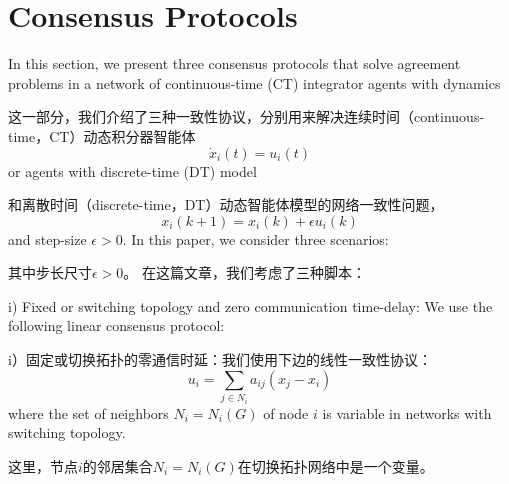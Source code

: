 \documentclass{article}
\begin{document}
\section{Consensus Protocols}
{\color[gray]{0.5}
\noindent In this section, we present three consensus protocols that solve agreement problems in a network of continuous-time (CT) {\color{green}integrator agents} with dynamics
}

\noindent 这一部分，我们介绍了三种一致性协议，分别用来解决连续时间（continuous-time，CT）动态积分器智能体
\begin{equation}
    \dot{x}_i(t) = u_i(t)
    \tag{4}
    \label{4}
\end{equation}
{\color[gray]{0.5}
\noindent or agents with discrete-time (DT) model
}

\noindent 和离散时间（discrete-time，DT）动态智能体模型的网络一致性问题，
\begin{equation}
    x_i(k+1) = x_i(k)+\epsilon u_i(k)
    \tag{5}
    \label{5}
\end{equation}
{\color[gray]{0.5}
\noindent and step-size $\epsilon>0$. 
In this paper, we consider three scenarios:
}

\noindent 其中步长尺寸$\epsilon>0$。
在这篇文章，我们考虑了三种脚本：

{\color[gray]{0.5}
i) Fixed or switching topology and zero communication time-delay: We use the following linear consensus protocol:
}

i）固定或切换拓扑的零通信时延：我们使用下边的线性一致性协议：
\begin{equation}
    u_i = \sum_{j\in N_i}a_{ij}(x_j-x_i)
    \tag{A1}
    \label{A1}
\end{equation}
{\color[gray]{0.5}
\noindent where the set of neighbors $N_i=N_i(G)$ of node $i$ is variable in networks with switching topology.
}

\noindent 这里，节点$i$的邻居集合$N_i=N_i(G)$在切换拓扑网络中是一个变量。
\end{document}
